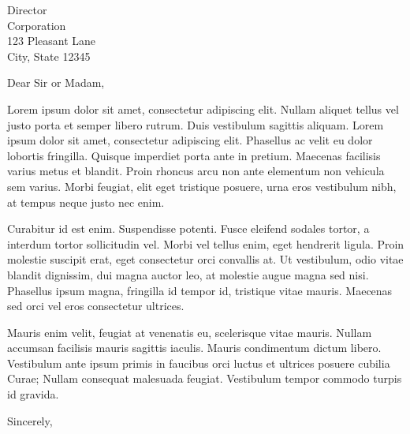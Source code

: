 \documentclass[
	pagenumber=false, %
	parskip=half, %
	fromalign=right, %
	foldmarks=true, %
	addrfield=true %
	]{scrlttr2}
\date{\today} %
\begin{document}
 
\begin{letter}{Director \\ Corporation \\ 123 Pleasant Lane \\ City, State 12345} %


\opening{Dear Sir or Madam,}

Lorem ipsum dolor sit amet, consectetur adipiscing elit. Nullam aliquet tellus vel justo porta et semper libero rutrum. Duis vestibulum sagittis aliquam. Lorem ipsum dolor sit amet, consectetur adipiscing elit. Phasellus ac velit eu dolor lobortis fringilla. Quisque imperdiet porta ante in pretium. Maecenas facilisis varius metus et blandit. Proin rhoncus arcu non ante elementum non vehicula sem varius. Morbi feugiat, elit eget tristique posuere, urna eros vestibulum nibh, at tempus neque justo nec enim.

Curabitur id est enim. Suspendisse potenti. Fusce eleifend sodales tortor, a interdum tortor sollicitudin vel. Morbi vel tellus enim, eget hendrerit ligula. Proin molestie suscipit erat, eget consectetur orci convallis at. Ut vestibulum, odio vitae blandit dignissim, dui magna auctor leo, at molestie augue magna sed nisi. Phasellus ipsum magna, fringilla id tempor id, tristique vitae mauris. Maecenas sed orci vel eros consectetur ultrices.

Mauris enim velit, feugiat at venenatis eu, scelerisque vitae mauris. Nullam accumsan facilisis mauris sagittis iaculis. Mauris condimentum dictum libero. Vestibulum ante ipsum primis in faucibus orci luctus et ultrices posuere cubilia Curae; Nullam consequat malesuada feugiat. Vestibulum tempor commodo turpis id gravida.

\closing{Sincerely,}



\end{letter}
 
\end{document}
